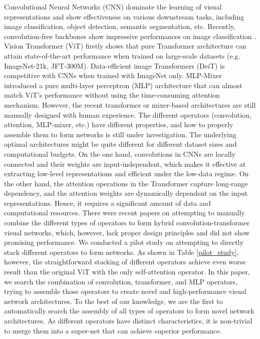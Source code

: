 \documentclass{article} \usepackage{iclr2022_conference,times}
\begin{document}
Convolutional Neural Networks (CNN) dominate the learning of visual representations and show effectiveness on various downstream tasks, including image classification, object detection, semantic segmentation, etc. 
Recently, convolution-free backbones show impressive performances on image classification \citep{imagenet}. Vision Transformer (ViT) \citep{vit} firstly shows that pure Transformer architecture can attain state-of-the-art performance when trained on large-scale datasets (e.g. ImageNet-21k, JFT-300M). 
Data-efficient image Transformers (DeiT) \citep{deit} is competitive with CNNs when trained with ImageNet only.
MLP-Mixer \citep{mixer} introduced a pure multi-layer perceptron (MLP) architecture that can almost match ViT's performance without using the time-consuming attention mechanism. 
However, the recent transformer or mixer-based architectures are still manually designed with human experience. The different operators (convolution, attention, MLP-mixer, etc.) have different properties, and how to properly assemble them to form networks is still under investigation. The underlying optimal architectures might be quite different for different dataset sizes and computational budgets. On the one hand, convolutions in CNNs are locally connected and their weights are input-independent, which makes it effective at extracting low-level representations and efficient under the low-data regime. On the other hand, the attention operations in the Transformer capture long-range dependency, and the attention weights are dynamically dependent on the input representations. Hence, it requires a significant amount of data and computational resources.
There were recent papers on attempting to manually combine the different types of operators \citep{convit,cvt} to form hybrid convolution-transformer visual networks, which, however, lack proper design principles and did not show promising performance. 
We conducted a pilot study on attempting to directly stack different operators to form networks. 
As shown in Table \ref{pilot_study}, however, the straightforward stacking of different operators achieve even worse result than the original ViT with the only self-attention operator.
In this paper, we search the combination of convolution, transformer, and MLP operators, trying to assemble those operators to create novel and high-performance visual network architectures. 
To the best of our knowledge, we are the first to automatically search the assembly of all types of operators to form novel network architectures. As different operators have distinct characteristics, it is non-trivial to merge them into a super-net that can achieve superior performance. 
\end{document}
